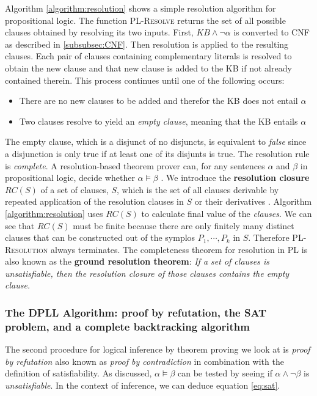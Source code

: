 Algorithm \ref{algorithm:resolution} shows a simple resolution algorithm for propositional logic. The function \textsc{PL-Resolve} returns the set of all possible clauses obtained by resolving its two inputs. First, $KB\wedge\neg\alpha$ is converted to CNF as described in \ref{subsubsec:CNF}. Then resolution is applied to the resulting clauses. Each pair of clauses containing complementary literals is resolved to obtain the new clause and that new clause is added to the KB if not already contained therein. This process continues until one of the following occurs:
\begin{itemize}
	\item There are no new clauses to be added and therefor the KB does not entail $\alpha$
	\item Two clauses resolve to yield an \textit{empty clause}, meaning that the KB entails $\alpha$
\end{itemize}

The empty clause, which is a disjunct of no disjuncts, is equivalent to \textit{false} since a disjunction is only true if at least one of its disjunts is true. 
The resolution rule is \textit{complete}. A resolution-based theorem prover can, for any sentences
$\alpha$ and $\beta$ in propositional logic, decide whether $\alpha \models \beta$ \citep{russell2016artificial}. We introduce the \textbf{resolution closure} $RC(S)$ of a set of clauses, $S$, which is the set of all clauses derivable by repeated application of the resolution clauses in $S$ or their derivatives \citep{russell2016artificial}. Algorithm \ref{algorithm:resolution} uses  $RC(S)$ to calculate final value of the \textit{clauses}. We can see that $RC(S)$ must be finite because there are only finitely many distinct clauses that can be constructed out of the symplos $P_1, \cdots, P_k$ in $S$. Therefore \textsc{PL-Resolution} always terminates. The completeness theorem for resolution in PL is also known as the \textbf{ground resolution theorem}: \textit{If a set of clauses is unsatisfiable, then the resolution closure of those clauses
contains the empty clause.}



\subsubsection{The DPLL Algorithm: proof by refutation, the SAT problem, and a complete backtracking algorithm}
\label{subsubsec:DPLLsec}

The second procedure for logical inference by theorem proving we look at is \textit{proof by refutation} also known as \textit{proof by contradiction} in combination with the definition of satisfiability. As discussed, $\alpha \models \beta$ can be tested by seeing if $\alpha \wedge \neg \beta$ is \textit{unsatisfiable}. In the context of inference, we can deduce equation \ref{eq:sat}.


